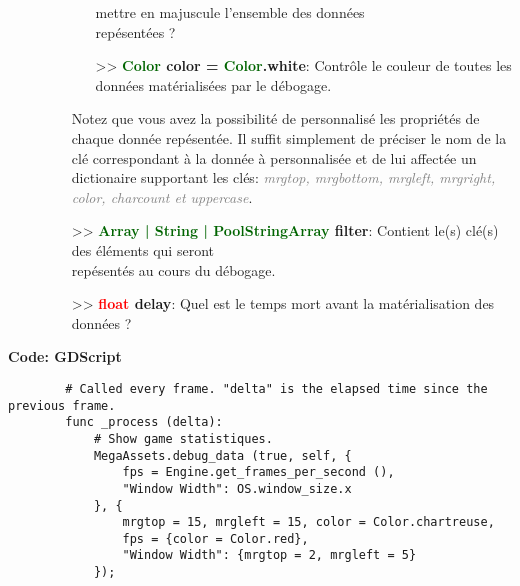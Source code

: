 \documentclass[a4paper, 11pt]{article}
\begin{document}
\begin{description}
\begin{itemize}
\begin{itemize}
				mettre en majuscule l'ensemble des données \\repésentées ?
				\item[>> \textbf{\textcolor{darkgreen}{Color} color = \textcolor{darkgreen}{Color}.white}:]
				Contrôle le couleur de toutes les données matérialisées par le débogage.
			\end{itemize}
			Notez que vous avez la possibilité de personnalisé les propriétés de chaque donnée repésentée.
			Il suffit simplement de préciser le nom de la clé correspondant à la donnée à personnalisée et
			de lui affectée un dictionaire supportant les clés: \textit{\textcolor{gray}{mrgtop, mrgbottom,
			mrgleft, mrgright, color, charcount et uppercase}}.
			\item[>> \textbf{\textcolor{darkgreen}{Array | String | PoolStringArray} filter}:] Contient
			le(s) clé(s) des éléments qui seront \\repésentés au cours du débogage.
			\item[>> \textbf{\textcolor{red}{float} delay}:] Quel est le temps mort avant la matérialisation 
			des données ?\\
		\end{itemize}
	\end{description}
	\textbf{Code: GDScript}
	\begin{lstlisting}
		# Called every frame. "delta" is the elapsed time since the previous frame.
		func _process (delta):
			# Show game statistiques.
			MegaAssets.debug_data (true, self, {
				fps = Engine.get_frames_per_second (),
				"Window Width": OS.window_size.x
			}, {
				mrgtop = 15, mrgleft = 15, color = Color.chartreuse,
				fps = {color = Color.red},
				"Window Width": {mrgtop = 2, mrgleft = 5}
			});
	\end{lstlisting}
\end{document}
